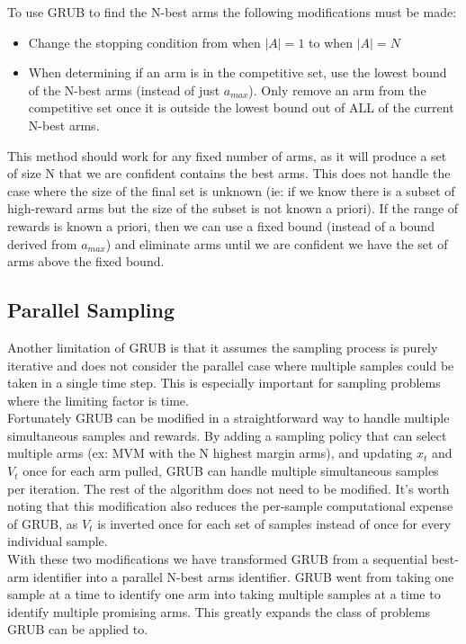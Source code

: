 \documentclass{article}[12pt]
\begin{document}
To use GRUB to find the N-best arms the following modifications must be made:
\begin{itemize}
    \item Change the stopping condition from when $|A|=1$ to when $|A|=N$
    \item When determining if an arm is in the competitive set, use the lowest bound of the N-best arms (instead of just $a_{max}$).
    Only remove an arm from the competitive set once it is outside the lowest bound out of ALL of the current N-best arms.
\end{itemize}

This method should work for any fixed number of arms, as it will produce a set of size N that we are confident contains the best arms.
This does not handle the case where the size of the final set is unknown
(ie: if we know there is a subset of high-reward arms but the size of the subset is not known a priori).
If the range of rewards is known a priori, then we can use a fixed bound (instead of a bound derived from $a_{max}$) and eliminate arms until we are confident we have the set of arms above the fixed bound.

\subsection{Parallel Sampling}

Another limitation of GRUB is that it assumes the sampling process is purely iterative and does not consider the parallel case where multiple samples could be taken in a single time step.
This is especially important for sampling problems where the limiting factor is time. \\

Fortunately GRUB can be modified in a straightforward way to handle multiple simultaneous samples and rewards.
By adding a sampling policy that can select multiple arms (ex: MVM with the N highest margin arms), and updating $x_t$ and $V_t$ once for each arm pulled,
GRUB can handle multiple simultaneous samples per iteration.
The rest of the algorithm does not need to be modified.
It’s worth noting that this modification also reduces the per-sample computational expense of GRUB,
as $V_t$ is inverted once for each set of samples instead of once for every individual sample. \\

With these two modifications we have transformed GRUB from a sequential best-arm identifier into a parallel N-best arms identifier.
GRUB went from taking one sample at a time to identify one arm into taking multiple samples at a time to identify multiple promising arms.
This greatly expands the class of problems GRUB can be applied to.
\end{document}
